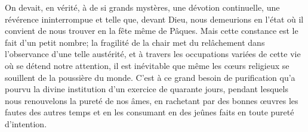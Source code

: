 On devait, en vérité, à de si grands mystères,
	une dévotion continuelle, une révérence ininterrompue
	et telle que, devant Dieu, nous demeurions en l’état
		où il convient de nous trouver en la fête même de Pâques.
Mais cette constance est le fait d’un petit nombre;
	la fragilité de la chair met du relâchement
		dans l’observance d’une telle austérité,
	et à travers les occupations variées de cette vie
		où se détend notre attention,
	il est inévitable que même les cœurs religieux
		se souillent de la poussière du monde.
C’est à ce grand besoin de purification
	qu’a pourvu la divine institution d’un exercice de quarante jours,
	pendant lesquels nous renouvelons la pureté de nos âmes,
	en rachetant par des bonnes œuvres les fautes des autres temps
	et en les consumant en des jeûnes faits en toute pureté d’intention.
